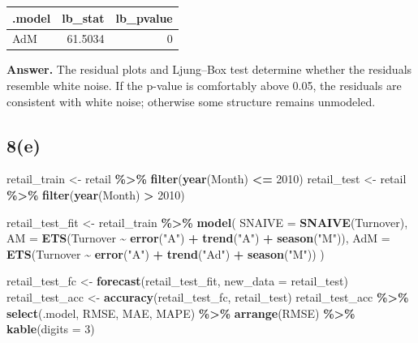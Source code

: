 \documentclass[
  11pt,
]{article}
\newenvironment{Shaded}{\begin{snugshade}}{\end{snugshade}}
\newcommand{\AttributeTok}[1]{\textcolor[rgb]{0.13,0.29,0.53}{#1}}
\newcommand{\DecValTok}[1]{\textcolor[rgb]{0.00,0.00,0.81}{#1}}
\newcommand{\FunctionTok}[1]{\textcolor[rgb]{0.13,0.29,0.53}{\textbf{#1}}}
\newcommand{\NormalTok}[1]{#1}
\newcommand{\OtherTok}[1]{\textcolor[rgb]{0.56,0.35,0.01}{#1}}
\newcommand{\SpecialCharTok}[1]{\textcolor[rgb]{0.81,0.36,0.00}{\textbf{#1}}}
\newcommand{\StringTok}[1]{\textcolor[rgb]{0.31,0.60,0.02}{#1}}
\newcounter{none} %
\begin{document}
{\def\LTcaptype{none} %
\begin{longtable}[]{@{}lrr@{}}
\toprule\noalign{}
.model & lb\_stat & lb\_pvalue \\
\midrule\noalign{}
\endhead
\bottomrule\noalign{}
\endlastfoot
AdM & 61.5034 & 0 \\
\end{longtable}
}

\textbf{Answer.} The residual plots and Ljung--Box test determine
whether the residuals resemble white noise. If the p-value is
comfortably above 0.05, the residuals are consistent with white noise;
otherwise some structure remains unmodeled.

\subsection{8(e)}\label{e-1}

\begin{Shaded}
\begin{Highlighting}[]
\NormalTok{retail\_train }\OtherTok{\textless{}{-}}\NormalTok{ retail }\SpecialCharTok{\%\textgreater{}\%} \FunctionTok{filter}\NormalTok{(}\FunctionTok{year}\NormalTok{(Month) }\SpecialCharTok{\textless{}=} \DecValTok{2010}\NormalTok{)}
\NormalTok{retail\_test  }\OtherTok{\textless{}{-}}\NormalTok{ retail }\SpecialCharTok{\%\textgreater{}\%} \FunctionTok{filter}\NormalTok{(}\FunctionTok{year}\NormalTok{(Month) }\SpecialCharTok{\textgreater{}} \DecValTok{2010}\NormalTok{)}

\NormalTok{retail\_test\_fit }\OtherTok{\textless{}{-}}\NormalTok{ retail\_train }\SpecialCharTok{\%\textgreater{}\%}
  \FunctionTok{model}\NormalTok{(}
    \AttributeTok{SNAIVE =} \FunctionTok{SNAIVE}\NormalTok{(Turnover),}
    \AttributeTok{AM =} \FunctionTok{ETS}\NormalTok{(Turnover }\SpecialCharTok{\textasciitilde{}} \FunctionTok{error}\NormalTok{(}\StringTok{"A"}\NormalTok{) }\SpecialCharTok{+} \FunctionTok{trend}\NormalTok{(}\StringTok{"A"}\NormalTok{) }\SpecialCharTok{+} \FunctionTok{season}\NormalTok{(}\StringTok{"M"}\NormalTok{)),}
    \AttributeTok{AdM =} \FunctionTok{ETS}\NormalTok{(Turnover }\SpecialCharTok{\textasciitilde{}} \FunctionTok{error}\NormalTok{(}\StringTok{"A"}\NormalTok{) }\SpecialCharTok{+} \FunctionTok{trend}\NormalTok{(}\StringTok{"Ad"}\NormalTok{) }\SpecialCharTok{+} \FunctionTok{season}\NormalTok{(}\StringTok{"M"}\NormalTok{))}
\NormalTok{  )}

\NormalTok{retail\_test\_fc }\OtherTok{\textless{}{-}} \FunctionTok{forecast}\NormalTok{(retail\_test\_fit, }\AttributeTok{new\_data =}\NormalTok{ retail\_test)}
\NormalTok{retail\_test\_acc }\OtherTok{\textless{}{-}} \FunctionTok{accuracy}\NormalTok{(retail\_test\_fc, retail\_test)}
\NormalTok{retail\_test\_acc }\SpecialCharTok{\%\textgreater{}\%} \FunctionTok{select}\NormalTok{(.model, RMSE, MAE, MAPE) }\SpecialCharTok{\%\textgreater{}\%} \FunctionTok{arrange}\NormalTok{(RMSE) }\SpecialCharTok{\%\textgreater{}\%} \FunctionTok{kable}\NormalTok{(}\AttributeTok{digits =} \DecValTok{3}\NormalTok{)}
\end{Highlighting}
\end{Shaded}
\end{document}

